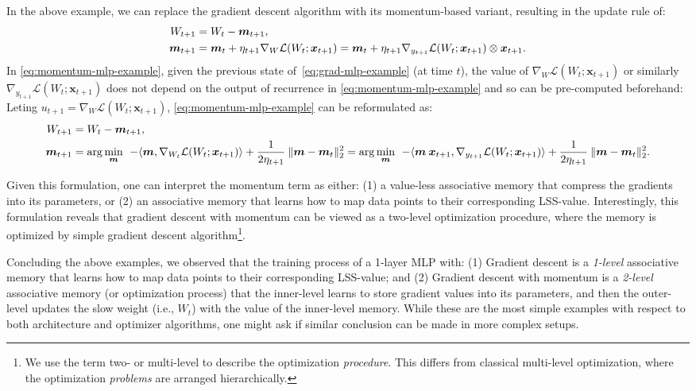 In the above example, we can replace the gradient descent algorithm with its  momentum-based variant, resulting in the update rule of:
\begin{align}\label{eq:grad-mlp-example}
    W_{t+1} &= W_t - \boldsymbol{m}_{t+1},\\ \label{eq:momentum-mlp-example}
    \boldsymbol{m}_{t+1} &= \boldsymbol{m}_{t} + \eta_{t+1} \nabla_{W} \mathcal{L}(W_t; \boldsymbol{x}_{t+1}) = \boldsymbol{m}_{t} + \eta_{t+1} \nabla_{y_{t+1}} \mathcal{L}(W_t; \boldsymbol{x}_{t+1}) \otimes \boldsymbol{x}_{t+1}.
\end{align}
In \autoref{eq:momentum-mlp-example}, given the previous state of~\autoref{eq:grad-mlp-example} (at time $t$), the value of $\nabla_{W} \mathcal{L}(W_t; \boldsymbol{x}_{t+1})$ or similarly $\nabla_{y_{t+1}} \mathcal{L}(W_t; \boldsymbol{x}_{t+1})$ does not depend on the output of recurrence in \autoref{eq:momentum-mlp-example} and so can be pre-computed beforehand: Leting $u_{t+1} = \nabla_{W} \mathcal{L}(W_t; \boldsymbol{x}_{t+1})$,  \autoref{eq:momentum-mlp-example} can be reformulated as:
\begin{align}\label{eq:reformulate-grad-mlp-example}
    W_{t+1} &= W_t - \boldsymbol{m}_{t+1},\\ \label{eq:reformulate-momentum-mlp-example}
    \boldsymbol{m}_{t+1} &= \arg\min_{\boldsymbol{m}} \:\: - \langle \boldsymbol{m}, \nabla_{W_t} \mathcal{L}(W_t; \boldsymbol{x}_{t+1}) \rangle + \frac{1}{2\eta_{t+1}}\:\| \boldsymbol{m} - \boldsymbol{m}_t \|^2_2 = \arg\min_{\boldsymbol{m}} \:\: - \langle \boldsymbol{m} \: \boldsymbol{x}_{t+1}, \nabla_{y_{t+1}} \mathcal{L}(W_t; \boldsymbol{x}_{t+1}) \rangle +\frac{1}{2\eta_{t+1}} \:\| \boldsymbol{m} - \boldsymbol{m}_t \|^2_2.
\end{align}
 
 Given this formulation, one can interpret the momentum term as either: (1) a value-less associative memory that compress the gradients into its parameters, or (2) an associative memory that learns how to map data points to their corresponding LSS-value. Interestingly, this formulation reveals that gradient descent with momentum can be viewed as a two-level optimization procedure, where the memory is optimized by simple gradient descent algorithm\footnote{We use the term two- or multi-level to describe the optimization \textit{procedure}. This differs from classical multi-level optimization, where the optimization \textit{problems} are arranged hierarchically.}. 
 

Concluding the above examples, we observed that the training process of a 1-layer MLP with: (1) Gradient descent is a \emph{1-level} associative memory that learns how to map data points to their corresponding LSS-value; and (2) Gradient descent with momentum is a \emph{2-level} associative memory (or optimization process) that the inner-level learns to store gradient values into its parameters, and then the outer-level updates the slow weight (i.e., $W_t$) with the value of the inner-level memory. While these are the most simple examples with respect to both architecture and optimizer algorithms, one might ask if similar conclusion can be made in more complex setups.    


